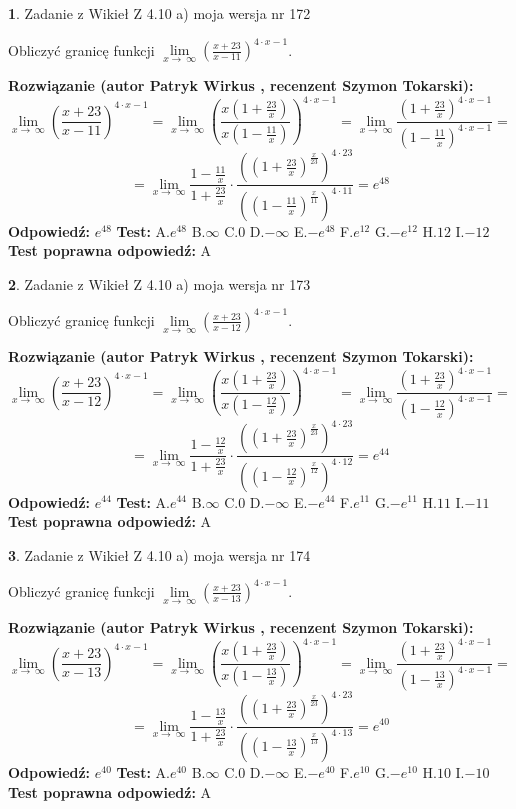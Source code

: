 \documentclass[12pt, a4paper]{article}
\theoremstyle{definition} %
\newtheorem{zad}{}
\newcommand{\zadStart}[1]{\begin{zad}#1\newline}
\newcommand{\zadStop}{\end{zad}}
\newcommand{\rozwStart}[2]{\noindent \textbf{Rozwiązanie (autor #1 , recenzent #2): }\newline}
\newcommand{\rozwStop}{\newline}
\newcommand{\odpStart}{\noindent \textbf{Odpowiedź:}\newline}
\newcommand{\odpStop}{\newline}
\newcommand{\testStart}{\noindent \textbf{Test:}\newline}
\newcommand{\testStop}{\newline}
\newcommand{\kluczStart}{\noindent \textbf{Test poprawna odpowiedź:}\newline}
\newcommand{\kluczStop}{\newline}
\begin{document}
\zadStart{Zadanie z Wikieł Z 4.10 a) moja wersja nr 172}

Obliczyć granicę funkcji  $\lim\limits_{x\to\ \infty}(\frac{x+23}{x-11})^{4\cdot x-1}$.
\zadStop
\rozwStart{Patryk Wirkus}{Szymon Tokarski}
$$\lim\limits_{x\to\ \infty}(\frac{x+23}{x-11})^{4\cdot x-1} = \lim\limits_{x\to\ \infty}(\frac{x(1+\frac{23}{x})}{x(1-\frac{11}{x})})^{4\cdot x-1}=\lim\limits_{x\to\ \infty}\frac{(1+\frac{23}{x})^{4\cdot x-1}}{(1-\frac{11}{x})^{4\cdot x-1}}=$$
$$=\lim\limits_{x\to\ \infty}\frac{1-\frac{11}{x}}{1+\frac{23}{x}}\cdot\frac{((1+\frac{23}{x})^{\frac{x}{23}})^{4\cdot23}}{((1-\frac{11}{x})^{\frac{x}{11}})^{4\cdot11}}=e^{48}$$
\rozwStop
\odpStart
$e^{48}$
\odpStop
\testStart
A.$e^{48}$ B.$\infty$ C.$0$ D.$-\infty$ E.$-e^{48}$
F.$e^{12}$ G.$-e^{12}$
H.$12$
I.$-12$
\testStop
\kluczStart
A
\kluczStop



\zadStart{Zadanie z Wikieł Z 4.10 a) moja wersja nr 173}

Obliczyć granicę funkcji  $\lim\limits_{x\to\ \infty}(\frac{x+23}{x-12})^{4\cdot x-1}$.
\zadStop
\rozwStart{Patryk Wirkus}{Szymon Tokarski}
$$\lim\limits_{x\to\ \infty}(\frac{x+23}{x-12})^{4\cdot x-1} = \lim\limits_{x\to\ \infty}(\frac{x(1+\frac{23}{x})}{x(1-\frac{12}{x})})^{4\cdot x-1}=\lim\limits_{x\to\ \infty}\frac{(1+\frac{23}{x})^{4\cdot x-1}}{(1-\frac{12}{x})^{4\cdot x-1}}=$$
$$=\lim\limits_{x\to\ \infty}\frac{1-\frac{12}{x}}{1+\frac{23}{x}}\cdot\frac{((1+\frac{23}{x})^{\frac{x}{23}})^{4\cdot23}}{((1-\frac{12}{x})^{\frac{x}{12}})^{4\cdot12}}=e^{44}$$
\rozwStop
\odpStart
$e^{44}$
\odpStop
\testStart
A.$e^{44}$ B.$\infty$ C.$0$ D.$-\infty$ E.$-e^{44}$
F.$e^{11}$ G.$-e^{11}$
H.$11$
I.$-11$
\testStop
\kluczStart
A
\kluczStop



\zadStart{Zadanie z Wikieł Z 4.10 a) moja wersja nr 174}

Obliczyć granicę funkcji  $\lim\limits_{x\to\ \infty}(\frac{x+23}{x-13})^{4\cdot x-1}$.
\zadStop
\rozwStart{Patryk Wirkus}{Szymon Tokarski}
$$\lim\limits_{x\to\ \infty}(\frac{x+23}{x-13})^{4\cdot x-1} = \lim\limits_{x\to\ \infty}(\frac{x(1+\frac{23}{x})}{x(1-\frac{13}{x})})^{4\cdot x-1}=\lim\limits_{x\to\ \infty}\frac{(1+\frac{23}{x})^{4\cdot x-1}}{(1-\frac{13}{x})^{4\cdot x-1}}=$$
$$=\lim\limits_{x\to\ \infty}\frac{1-\frac{13}{x}}{1+\frac{23}{x}}\cdot\frac{((1+\frac{23}{x})^{\frac{x}{23}})^{4\cdot23}}{((1-\frac{13}{x})^{\frac{x}{13}})^{4\cdot13}}=e^{40}$$
\rozwStop
\odpStart
$e^{40}$
\odpStop
\testStart
A.$e^{40}$ B.$\infty$ C.$0$ D.$-\infty$ E.$-e^{40}$
F.$e^{10}$ G.$-e^{10}$
H.$10$
I.$-10$
\testStop
\kluczStart
A
\kluczStop
\end{document}
